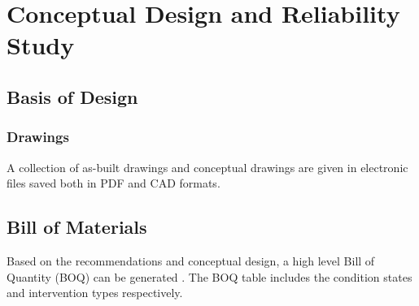 \chapter{Conceptual Design and Reliability Study} %
\label{Chapter6}
%
\section{Basis of Design}
\subsection{Drawings}
A collection of as-built drawings and conceptual drawings are given in electronic files saved both in PDF and CAD formats.

\section{Bill of Materials}
Based on the recommendations and conceptual design, a high level Bill of Quantity (BOQ) can be generated . The BOQ table includes the condition states and intervention types respectively. 



